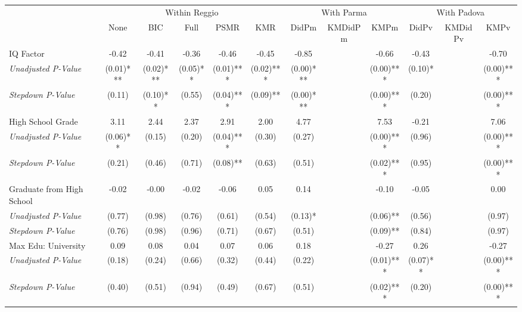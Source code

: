 \begin{tabular}{l c c c c c c c c c c c}
\toprule
& \multicolumn{5}{c}{Within Reggio} & \multicolumn{3}{c}{With Parma} & \multicolumn{3}{c}{With Padova} \\\cmidrule(lr){2-6} \cmidrule(lr){7-9} \cmidrule(lr){10-12}
 & None & BIC & Full & PSMR & KMR & DidPm & KMDidPm & KMPm & DidPv & KMDidPv & KMPv \\
\midrule
IQ Factor & -0.42 & -0.41 & -0.36 & -0.46 & -0.45 & -0.85 & & -0.66 & -0.43 & & -0.70 \\
\quad \textit{Unadjusted P-Value} & (0.01)*** & (0.02)*** & (0.05)** & (0.01)*** & (0.02)*** & (0.00)*** & & (0.00)*** & (0.10)* & & (0.00)*** \\
\quad \textit{Stepdown P-Value} & (0.11) & (0.10)** & (0.55) & (0.04)*** & (0.09)** & (0.00)*** & & (0.00)*** & (0.20) & & (0.00)*** \\
High School Grade & 3.11 & 2.44 & 2.37 & 2.91 & 2.00 & 4.77 & & 7.53 & -0.21 & & 7.06 \\
\quad \textit{Unadjusted P-Value} & (0.06)** & (0.15) & (0.20) & (0.04)*** & (0.30) & (0.27) & & (0.00)*** & (0.96) & & (0.00)*** \\
\quad \textit{Stepdown P-Value} & (0.21) & (0.46) & (0.71) & (0.08)** & (0.63) & (0.51) & & (0.02)*** & (0.95) & & (0.00)*** \\
Graduate from High School & -0.02 & -0.00 & -0.02 & -0.06 & 0.05 & 0.14 & & -0.10 & -0.05 & & 0.00 \\
\quad \textit{Unadjusted P-Value} & (0.77) & (0.98) & (0.76) & (0.61) & (0.54) & (0.13)* & & (0.06)** & (0.56) & & (0.97) \\
\quad \textit{Stepdown P-Value} & (0.76) & (0.98) & (0.96) & (0.71) & (0.67) & (0.51) & & (0.09)** & (0.84) & & (0.97) \\
Max Edu: University & 0.09 & 0.08 & 0.04 & 0.07 & 0.06 & 0.18 & & -0.27 & 0.26 & & -0.27 \\
\quad \textit{Unadjusted P-Value} & (0.18) & (0.24) & (0.66) & (0.32) & (0.44) & (0.22) & & (0.01)*** & (0.07)** & & (0.00)*** \\
\quad \textit{Stepdown P-Value} & (0.40) & (0.51) & (0.94) & (0.49) & (0.67) & (0.51) & & (0.02)*** & (0.20) & & (0.00)*** \\
\bottomrule
\end{tabular}
